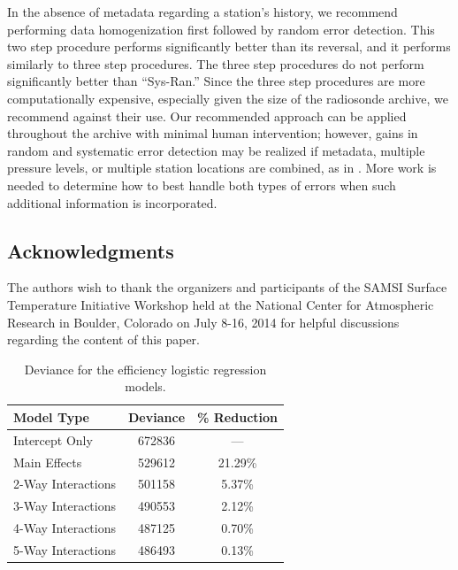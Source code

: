 \documentclass[12pt]{article}
\begin{document}
\begin{doublespacing}
In the absence of metadata regarding a station's history, we recommend performing data homogenization first followed by random error detection.  This two step procedure performs significantly better than its reversal, and it performs similarly to three step procedures.  The three step procedures do not perform significantly better than ``Sys-Ran.''  Since the three step procedures are more computationally expensive, especially given the size of the radiosonde archive, we recommend against their use.  Our recommended approach can be applied throughout the archive with minimal human intervention;   however, gains in random and systematic error detection may be realized if metadata, multiple pressure levels, or multiple station locations are combined, as in \cite{ignaccolo14}.  More work is needed to determine how to best handle both types of errors  when such additional information is incorporated.   

\subsection*{Acknowledgments} The authors wish to thank the organizers and participants of the SAMSI Surface Temperature Initiative Workshop held at the National Center for Atmospheric Research in Boulder, Colorado on July 8-16, 2014 for helpful discussions regarding the content of this paper.

\end{doublespacing}






\clearpage
\begin{table}[ht]
	\centering
	\begin{tabular}{lcc}
  		\hline
		Model Type & Deviance & \% Reduction\\
		\hline
		Intercept Only & 672836 & ---\\ 
  		Main Effects & 529612 & 21.29\%\\ 
  		2-Way Interactions & 501158 & 5.37\%\\ 
  		3-Way Interactions & 490553 & 2.12\% \\ 
  		4-Way Interactions & 487125 & 0.70\% \\ 
  		5-Way Interactions & 486493 & 0.13\% \\ 
   		\hline
	\end{tabular}
	\caption{Deviance for the efficiency logistic regression models.}
	\label{tab:homOrdDev}
\end{table}
\end{document}
